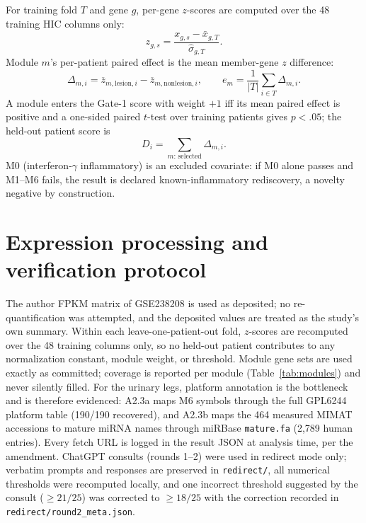 \documentclass[11pt,a4paper]{article}
\begin{document}
For training fold $T$ and gene $g$, per-gene $z$-scores are computed over the
48 training HIC columns only:
\begin{equation}
z_{g,s}=\frac{x_{g,s}-\bar x_{g,T}}{\hat\sigma_{g,T}}.
\end{equation}
Module $m$'s per-patient paired effect is the mean member-gene $z$ difference:
\begin{equation}
\Delta_{m,i}=\overline{z}_{m,\mathrm{lesion},i}-\overline{z}_{m,\mathrm{nonlesion},i},
\qquad
e_m=\frac{1}{|T|}\sum_{i\in T}\Delta_{m,i}.
\end{equation}
A module enters the Gate-1 score with weight $+1$ iff its mean paired effect is
positive and a one-sided paired $t$-test over training patients gives $p<.05$;
the held-out patient score is
\begin{equation}
D_i=\sum_{m:\,\mathrm{selected}} \Delta_{m,i}.
\end{equation}
M0 (interferon-$\gamma$ inflammatory) is an excluded covariate: if M0 alone
passes and M1--M6 fails, the result is declared known-inflammatory rediscovery,
a novelty negative by construction.

\begin{table}[h]\centering\small
\caption{Locked modules (gene counts; matrix coverage in parentheses).}
\label{tab:modules}

\end{table}

\section{Expression processing and verification protocol}
The author FPKM matrix of GSE238208 is used as deposited; no re-quantification
was attempted, and the deposited values are treated as the study's own
summary. Within each leave-one-patient-out fold, $z$-scores are recomputed
over the 48 training columns only, so no held-out patient contributes to any
normalization constant, module weight, or threshold. Module gene sets are used
exactly as committed; coverage is reported per module (Table~\ref{tab:modules})
and never silently filled. For the urinary legs, platform annotation is the
bottleneck and is therefore evidenced: A2.3a maps M6 symbols through the full
GPL6244 platform table (190/190 recovered), and A2.3b maps the 464 measured
MIMAT accessions to mature miRNA names through miRBase \texttt{mature.fa}
(2{,}789 human entries). Every fetch URL is logged in the result JSON at
analysis time, per the amendment. ChatGPT consults (rounds 1--2) were used in
redirect mode only; verbatim prompts and responses are preserved in
\texttt{redirect/}, all numerical thresholds were recomputed locally, and one
incorrect threshold suggested by the consult ($\geq21/25$) was corrected to
$\geq18/25$ with the correction recorded in \texttt{redirect/round2\_meta.json}.
\end{document}
